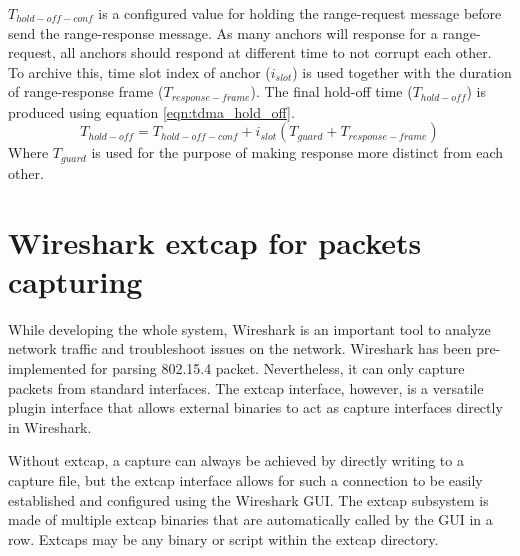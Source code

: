 \documentclass[\main/main.tex]{subfiles}
\begin{document}
$T_{hold-off-conf}$ is a configured value for holding the range-request message before send the range-response message.
As many anchors will response for a range-request, all anchors should respond at different time to not corrupt each other. To archive this, time slot index of anchor ($i_{slot}$) is used together with the duration of range-response frame ($T_{response-frame}$). The final hold-off time ($T_{hold-off}$) is produced using equation \ref{eqn:tdma_hold_off}.
\begin{equation}
   T_{hold-off} = T_{hold-off-conf} + i_{slot}(T_{guard} + T_{response-frame})
   \label{eqn:tdma_hold_off}
\end{equation}
Where $T_{guard}$ is used for the purpose of making response more distinct from each other.



\section{Wireshark extcap for packets capturing}
While developing the whole system, Wireshark is an important tool to analyze network traffic and troubleshoot issues on the network. Wireshark has been pre-implemented for parsing 802.15.4 packet. Nevertheless, it can only capture packets from standard interfaces. The extcap interface, however, is a versatile plugin interface that allows external binaries to act as capture interfaces directly in Wireshark.

Without extcap, a capture can always be achieved by directly writing to a capture file, but the extcap interface allows for such a connection to be easily established and configured using the Wireshark GUI. The extcap subsystem is made of multiple extcap binaries that are automatically called by the GUI in a row. Extcaps may be any binary or script within the extcap directory.
\end{document}
